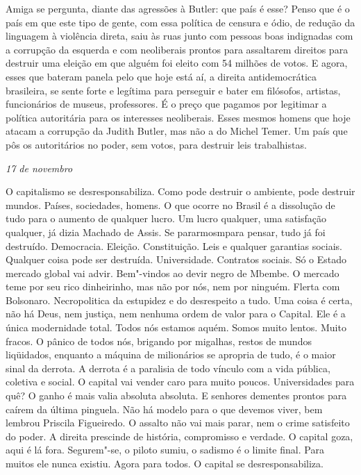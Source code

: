 Amiga se pergunta, diante das agressões à Butler: que país é esse? Penso
que é o país em que este tipo de gente, com essa política de censura e
ódio, de redução da linguagem à violência direta, saiu às ruas junto com
pessoas boas indignadas com a corrupção da esquerda e com neoliberais
prontos para assaltarem direitos para destruir uma eleição em que alguém
foi eleito com 54 milhões de votos. E agora, esses que bateram panela
pelo que hoje está aí, a direita antidemocrática brasileira, se sente
forte e legítima para perseguir e bater em filósofos, artistas,
funcionários de museus, professores. É o preço que pagamos por legitimar
a política autoritária para os interesses neoliberais. Esses mesmos
homens que hoje atacam a corrupção da Judith Butler, mas não a do Michel
Temer. Um país que pôs os autoritários no poder, sem votos, para
destruir leis trabalhistas.

\begin{flushright}
\emph{17 de novembro}
\end{flushright}

O capitalismo se desresponsabiliza. Como pode destruir o ambiente, pode
destruir mundos. Países, sociedades, homens. O que ocorre no Brasil é a
dissolução de tudo para o aumento de qualquer lucro. Um lucro qualquer,
uma satisfação qualquer, já dizia Machado de Assis. Se pararmosmpara
pensar, tudo já foi destruído. Democracia. Eleição. Constituição. Leis e
qualquer garantias sociais. Qualquer coisa pode ser destruída.
Universidade. Contratos sociais. Só o Estado mercado global vai advir.
Bem"-vindos ao devir negro de Mbembe. O mercado teme por seu rico
dinheirinho, mas não por nós, nem por ninguém. Flerta com Bolsonaro.
Necropolitica da estupidez e do desrespeito a tudo. Uma coisa é certa,
não há Deus, nem justiça, nem nenhuma ordem de valor para o Capital. Ele
é a única modernidade total. Todos nós estamos aquém. Somos muito
lentos. Muito fracos. O pânico de todos nós, brigando por migalhas,
restos de mundos liqüidados, enquanto a máquina de milionários se
apropria de tudo, é o maior sinal da derrota. A derrota é a paralisia de
todo vínculo com a vida pública, coletiva e social. O capital vai vender
caro para muito poucos. Universidades para quê? O ganho é mais valia
absoluta absoluta. E senhores dementes prontos para caírem da última
pinguela. Não há modelo para o que devemos viver, bem lembrou Priscila
Figueiredo. O assalto não vai mais parar, nem o crime satisfeito do
poder. A direita prescinde de história, compromisso e verdade. O capital
goza, aqui é lá fora. Segurem"-se, o piloto sumiu, o sadismo é o limite
final. Para muitos ele nunca existiu. Agora para todos. O capital se
desresponsabiliza.

